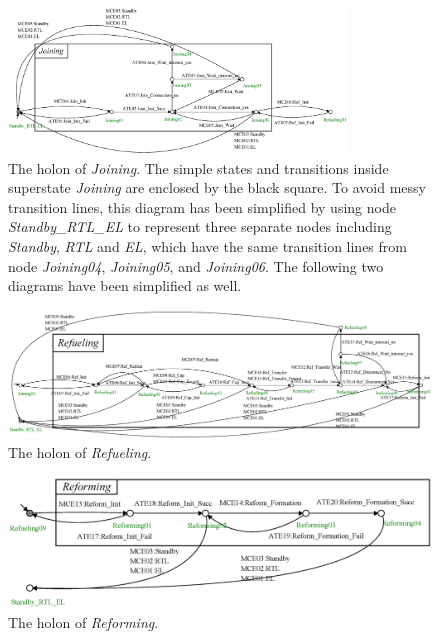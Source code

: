 \begin{figure}[h]
	\begin{center}
		\includegraphics[width=0.8\textwidth]{Figures/Figs_Ch14/Fig13_HJoining}
		\par\end{center}
	\caption{The holon of \textit{Joining}. The simple states and transitions inside superstate \textit{Joining} are enclosed by the black square. To avoid messy transition lines, this diagram has been simplified by using node \textit{Standby\_RTL\_EL} to represent three separate nodes including \textit{Standby}, \textit{RTL} and \textit{EL}, which have the same transition lines from node \textit{Joining04}, \textit{Joining05}, and \textit{Joining06}. The following two diagrams have been simplified as well.}
	\label{fig:plantjoi} 
\end{figure}

\begin{figure}[h]
	\begin{center}
		\includegraphics[width=1\textwidth]{Figures/Figs_Ch14/Fig14_HRefueling}
		\par\end{center}
	\caption{The holon of \textit{Refueling}.}
	\label{fig:plantref} 
\end{figure}

\begin{figure}[h]
	\begin{center}
		\includegraphics[width=1\textwidth]{Figures/Figs_Ch14/Fig15_HReform}
		\par\end{center}
	\caption{The holon of \textit{Reforming}.}
	\label{fig:plantreforming} 
\end{figure}


